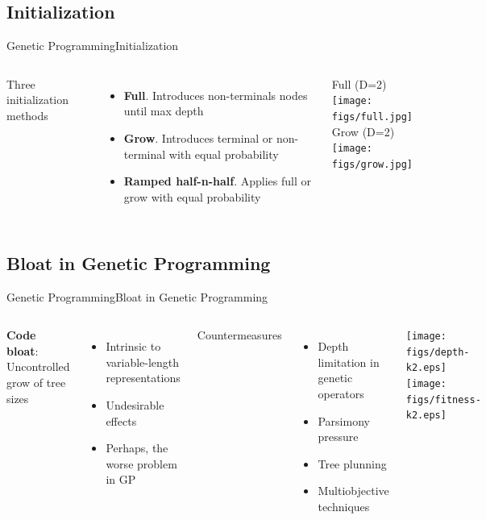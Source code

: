 \documentclass[10pt,compress]{beamer} %
\begin{document}
\subsection{Initialization}
\begin{frame}{Genetic Programming}{Initialization} 
	\vspace{-0.2cm}
    \begin{columns}
		Three initialization methods
		\begin{itemize}
			\item \textbf{Full}. Introduces non-terminals nodes until max depth
			\item \textbf{Grow}. Introduces terminal or non-terminal with equal probability
			\item \textbf{Ramped half-n-half}. Applies full or grow with equal probability
		\end{itemize}

		\begin{center}
			Full (D=2)\\
			\texttt{[image: figs/full.jpg]}\\
			\bigskip
			Grow (D=2)\\
			\texttt{[image: figs/grow.jpg]}
		\end{center}
	\end{columns}
\end{frame}

\subsection{Bloat in Genetic Programming}
\begin{frame}{Genetic Programming}{Bloat in Genetic Programming} 
	\vspace{-0.5cm}
    \begin{columns}
		\textbf{Code bloat}: Uncontrolled grow of tree sizes
		\begin{itemize}
			\item Intrinsic to variable-length representations
			\item Undesirable effects
			\item Perhaps, the worse problem in GP
		\end{itemize}

		Countermeasures
		\begin{itemize}
			\item Depth limitation in genetic operators
			\item Parsimony pressure
			\item Tree plunning
			\item Multiobjective techniques
		\end{itemize}

		\begin{center}
			\texttt{[image: figs/depth-k2.eps]}\\
			\texttt{[image: figs/fitness-k2.eps]}
		\end{center}
	\end{columns}
\end{frame}
\end{document}
